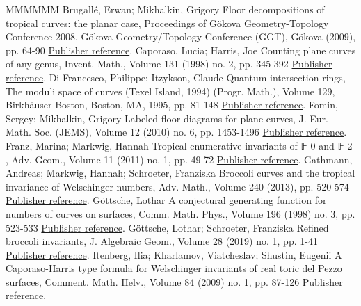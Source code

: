 \begin{thebibliography}{MMMMMM}
 Brugallé, Erwan; Mikhalkin, Grigory Floor decompositions of tropical curves: the planar case, Proceedings of Gökova Geometry-Topology Conference 2008, Gökova Geometry/Topology Conference (GGT), Gökova (2009), pp. 64-90 \href{https://alco.centre-mersenne.org/articles/10.5802/alco.444/#brugalle_floor_2008}{Publisher reference}.
 Caporaso, Lucia; Harris, Joe Counting plane curves of any genus, Invent. Math., Volume 131 (1998) no. 2, pp. 345-392 \href{https://alco.centre-mersenne.org/articles/10.5802/alco.444/#caporaso_counting_1998}{Publisher reference}.
 Di Francesco, Philippe; Itzykson, Claude Quantum intersection rings, The moduli space of curves (Texel Island, 1994) (Progr. Math.), Volume 129, Birkhäuser Boston, Boston, MA, 1995, pp. 81-148 \href{https://alco.centre-mersenne.org/articles/10.5802/alco.444/#di_francesco_quantum_1995}{Publisher reference}.
 Fomin, Sergey; Mikhalkin, Grigory Labeled floor diagrams for plane curves, J. Eur. Math. Soc. (JEMS), Volume 12 (2010) no. 6, pp. 1453-1496 \href{https://alco.centre-mersenne.org/articles/10.5802/alco.444/#fomin_labeled_2010}{Publisher reference}.
 Franz, Marina; Markwig, Hannah Tropical enumerative invariants of 𝔽 0  and 𝔽 2 , Adv. Geom., Volume 11 (2011) no. 1, pp. 49-72 \href{https://alco.centre-mersenne.org/articles/10.5802/alco.444/#franz-2011-tropical}{Publisher reference}.
 Gathmann, Andreas; Markwig, Hannah; Schroeter, Franziska Broccoli curves and the tropical invariance of Welschinger numbers, Adv. Math., Volume 240 (2013), pp. 520-574 \href{https://alco.centre-mersenne.org/articles/10.5802/alco.444/#gathmann-2013-broccoli}{Publisher reference}.
 Göttsche, Lothar A conjectural generating function for numbers of curves on surfaces, Comm. Math. Phys., Volume 196 (1998) no. 3, pp. 523-533 \href{https://alco.centre-mersenne.org/articles/10.5802/alco.444/#gottsche_conjectural_1998}{Publisher reference}.
 Göttsche, Lothar; Schroeter, Franziska Refined broccoli invariants, J. Algebraic Geom., Volume 28 (2019) no. 1, pp. 1-41 \href{https://alco.centre-mersenne.org/articles/10.5802/alco.444/#gottsche_refined_2019}{Publisher reference}.
 Itenberg, Ilia; Kharlamov, Viatcheslav; Shustin, Eugenii A Caporaso-Harris type formula for Welschinger invariants of real toric del Pezzo surfaces, Comment. Math. Helv., Volume 84 (2009) no. 1, pp. 87-126 \href{https://alco.centre-mersenne.org/articles/10.5802/alco.444/#itenberg-2009-caporaso}{Publisher reference}.

\end{thebibliography}
